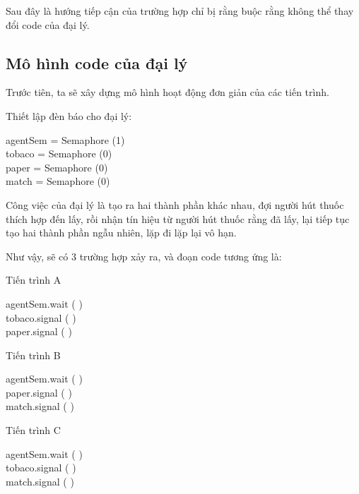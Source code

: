 \documentclass[a4paper]{article}
\begin{document}
	Sau đây là hướng tiếp cận của trường hợp chỉ bị rằng buộc rằng không thể thay đổi code của đại lý.

	\subsection{Mô hình code của đại lý}
	Trước tiên, ta sẽ xây dựng mô hình hoạt động đơn giản của các tiến trình.

	Thiết lập đèn báo cho đại lý:

	\begin{tcolorbox}
		agentSem = Semaphore (1)\\
		tobaco = Semaphore (0)\\
		paper = Semaphore (0)\\
		match = Semaphore (0)
	\end{tcolorbox}

	Công việc của đại lý là tạo ra hai thành phần khác nhau, đợi người hút thuốc thích hợp đến lấy,
	rồi nhận tín hiệu từ người hút thuốc rằng đã lấy, lại tiếp tục tạo hai thành phần ngẫu nhiên, lặp đi lặp lại vô hạn.

	Như vậy, sẽ có 3 trường hợp xảy ra, và đoạn code tương ứng là:
	
	\begin{center}
	Tiến trình A
	\begin{tcolorbox}
		agentSem.wait ( ) \\
		tobaco.signal ( ) \\
		paper.signal ( )
	\end{tcolorbox} 
	\end{center}
	\begin{center}
	{Tiến trình B}
	\begin{tcolorbox}
		agentSem.wait ( ) \\
		paper.signal ( ) \\
		match.signal ( )
	\end{tcolorbox} 
	\end{center}
	\begin{center}
	{Tiến trình C}
	\begin{tcolorbox}
		agentSem.wait ( ) \\
		tobaco.signal ( ) \\
		match.signal ( )
	\end{tcolorbox}	
	\end{center}
	
\end{document}
